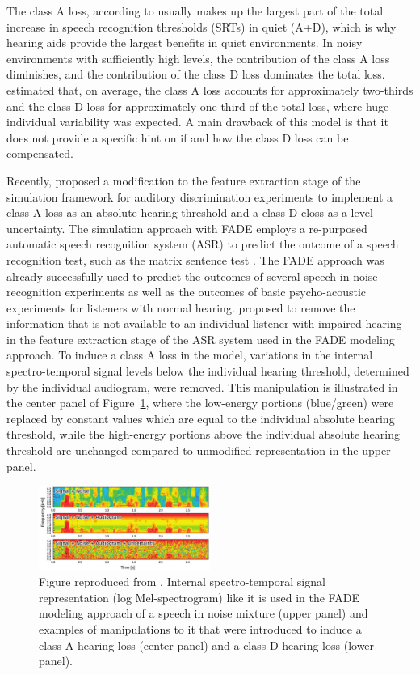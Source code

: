 \documentclass[10pt,a4paper,twocolumn]{article}
\begin{document}
The class A loss, according to \cite{plomp1978} usually makes up the largest part of the total increase in speech recognition thresholds (SRTs) in quiet (A+D), which is why hearing aids provide the largest benefits in quiet environments.
%
In noisy environments with sufficiently high levels, the contribution of the class A loss diminishes, and the contribution of the class D loss dominates the total loss.
%
\cite{plomp1978} estimated that, on average, the class A loss accounts for approximately two-thirds and the class D loss for approximately one-third of the total loss, where huge individual variability was expected.
%
A main drawback of this model is that it does not provide a specific hint on if and how the class D loss can be compensated.

Recently, \cite{kollmeier2016} proposed a modification to the feature extraction stage of the simulation framework for auditory discrimination experiments \citep[FADE,][]{schaedler2016a} to implement a class A loss as an absolute hearing threshold and a class D closs as a level uncertainty.
%
The simulation approach with FADE employs a re-purposed automatic speech recognition system (ASR) to predict the outcome of a speech recognition test, such as the matrix sentence test \citep{kollmeier2015}.
%
The FADE approach was already successfully used to predict the outcomes of several speech in noise recognition experiments \citep{schaedler2015,schaedler2016b} as well as the outcomes of basic psycho-acoustic experiments \citep{schaedler2016a} for listeners with normal hearing.
%
\cite{kollmeier2016} proposed to remove the information that is not available to an individual listener with impaired hearing in the feature extraction stage of the ASR system used in the FADE modeling approach.
%
To induce a class A loss in the model, variations in the internal spectro-temporal signal levels below the individual hearing threshold, determined by the individual audiogram, were removed.
%
This manipulation is illustrated in the center panel of Figure~\ref{fig:1}, where the low-energy portions (blue/green) were replaced by constant values which are equal to the individual absolute hearing threshold, while the high-energy portions above the individual absolute hearing threshold are unchanged compared to unmodified representation in the upper panel.
%
\begin{figure}[h]
	\centerline{\includegraphics[width=0.5\textwidth]{images/kollmeier-LOGMS-A-D}} 
	\caption{Figure reproduced from \cite{kollmeier2015}.
		Internal spectro-temporal signal representation (log Mel-spectrogram) like it is used in the FADE modeling approach of a speech in noise mixture (upper panel) and examples of manipulations to it that were introduced to induce a class A hearing loss (center panel) and a class D hearing loss (lower panel).}
	\label{fig:1}
\end{figure}
\end{document}
